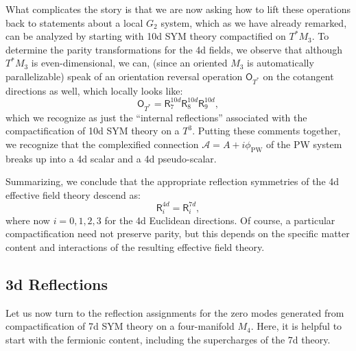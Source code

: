 \documentclass[12pt]{article}%
\numberwithin{equation}{section}
\renewcommand{\(}{\left(}
\renewcommand{\)}{\right)}
\renewcommand{\[}{\left[}
\renewcommand{\]}{\right]}
\begin{document}
What complicates the story is that we are now asking how to lift these operations back to statements about a local $G_2$ system,
which as we have already remarked, can be analyzed by starting with 10d SYM theory compactified on $T^{\ast} M_3$. To determine the parity transformations for the 4d fields, we observe that although $T^{\ast} M_3$ is even-dimensional, we can, (since an oriented $M_3$ is automatically parallelizable) speak of an orientation reversal operation $\mathsf{O}_{T^{\ast}}$ on the cotangent directions as well, which locally looks like:
\begin{equation}
\mathsf{O}_{T^{\ast}} = \mathsf{R}^{10d}_{7} \mathsf{R}^{10d}_{8} \mathsf{R}^{10d}_{9},
\end{equation}
which we recognize as just the ``internal reflections'' associated with the compactification of 10d SYM theory on a $T^3$. Putting these comments together, we recognize that the complexified connection $\mathcal{A} = A + i \phi_{\mathrm{PW}}$ of the PW system breaks up into
a 4d scalar and a 4d pseudo-scalar.

Summarizing, we conclude that the appropriate reflection symmetries
of the 4d effective field theory descend as:
\begin{equation} \label{eqn:4d10dlift}
\mathsf{R}^{4d}_{i} = \mathsf{R}^{7d}_{i},
\end{equation}
where now $i = 0,1,2,3$ for the 4d Euclidean directions. Of course, a particular compactification need not preserve parity, but this depends
on the specific matter content and interactions of the resulting effective field theory.

\subsection{3d Reflections}\label{subsec:3dref}

Let us now turn to the reflection assignments for the zero modes generated from compactification of 7d SYM theory on a four-manifold $M_4$.
Here, it is helpful to start with the fermionic content, including the supercharges of the 7d theory.
\end{document}
